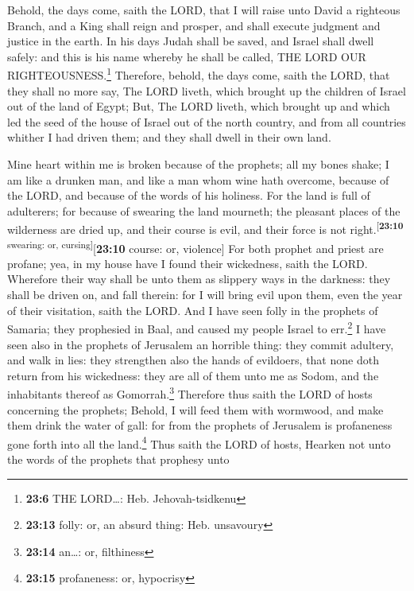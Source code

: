  Behold, the days come, saith the LORD, that I will raise
unto David a righteous Branch, and a King shall reign and prosper, and
shall execute judgment and justice in the earth.  In his
days Judah shall be saved, and Israel shall dwell safely: and this is
his name whereby he shall be called, THE LORD OUR
RIGHTEOUSNESS.\footnote{\textbf{23:6} THE LORD\ldots: Heb.
  Jehovah-tsidkenu}  Therefore, behold, the days come,
saith the LORD, that they shall no more say, The LORD liveth, which
brought up the children of Israel out of the land of Egypt;
 But, The LORD liveth, which brought up and which led the
seed of the house of Israel out of the north country, and from all
countries whither I had driven them; and they shall dwell in their own
land.

 Mine heart within me is broken because of the prophets;
all my bones shake; I am like a drunken man, and like a man whom wine
hath overcome, because of the LORD, and because of the words of his
holiness.  For the land is full of adulterers; for
because of swearing the land mourneth; the pleasant places of the
wilderness are dried up, and their course is evil, and their force is
not right.\textsuperscript{{[}\textbf{23:10} swearing: or,
cursing{]}}{[}\textbf{23:10} course: or, violence{]}  For
both prophet and priest are profane; yea, in my house have I found their
wickedness, saith the LORD.  Wherefore their way shall be
unto them as slippery ways in the darkness: they shall be driven on, and
fall therein: for I will bring evil upon them, even the year of their
visitation, saith the LORD.  And I have seen folly in the
prophets of Samaria; they prophesied in Baal, and caused my people
Israel to err.\footnote{\textbf{23:13} folly: or, an absurd thing: Heb.
  unsavoury}  I have seen also in the prophets of
Jerusalem an horrible thing: they commit adultery, and walk in lies:
they strengthen also the hands of evildoers, that none doth return from
his wickedness: they are all of them unto me as Sodom, and the
inhabitants thereof as Gomorrah.\footnote{\textbf{23:14} an\ldots: or,
  filthiness}  Therefore thus saith the LORD of hosts
concerning the prophets; Behold, I will feed them with wormwood, and
make them drink the water of gall: for from the prophets of Jerusalem is
profaneness gone forth into all the land.\footnote{\textbf{23:15}
  profaneness: or, hypocrisy}  Thus saith the LORD of
hosts, Hearken not unto the words of the prophets that prophesy unto
